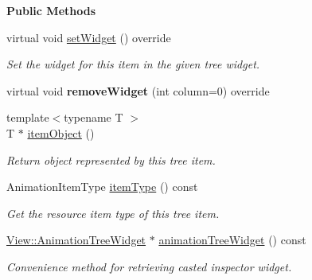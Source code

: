 \begin{Indent}\textbf{ Public Methods}\par
\begin{DoxyCompactItemize}
\item 
virtual void \mbox{\hyperlink{classrev_1_1_view_1_1_animation_item_a20494b0ab95631fb2e2aec918952f0f4}{set\+Widget}} () override
\begin{DoxyCompactList}\small\item\em Set the widget for this item in the given tree widget. \end{DoxyCompactList}\item 
\mbox{\label{classrev_1_1_view_1_1_animation_item_acafd1d856ce7505f4e964dff84ec1024}} 
virtual void {\bfseries remove\+Widget} (int column=0) override
\item 
\mbox{\label{classrev_1_1_view_1_1_animation_item_acf676bee2e51dd909fd2ac2ae34f4c7b}} 
{\footnotesize template$<$typename T $>$ }\\T $\ast$ \mbox{\hyperlink{classrev_1_1_view_1_1_animation_item_acf676bee2e51dd909fd2ac2ae34f4c7b}{item\+Object}} ()
\begin{DoxyCompactList}\small\item\em Return object represented by this tree item. \end{DoxyCompactList}\item 
\mbox{\label{classrev_1_1_view_1_1_animation_item_a7f8cdc9a524128e1520e3d54291ca4a0}} 
Animation\+Item\+Type \mbox{\hyperlink{classrev_1_1_view_1_1_animation_item_a7f8cdc9a524128e1520e3d54291ca4a0}{item\+Type}} () const
\begin{DoxyCompactList}\small\item\em Get the resource item type of this tree item. \end{DoxyCompactList}\item 
\mbox{\label{classrev_1_1_view_1_1_animation_item_aca4538c6c57402168b4c17d431552db0}} 
\mbox{\hyperlink{classrev_1_1_view_1_1_animation_tree_widget}{View\+::\+Animation\+Tree\+Widget}} $\ast$ \mbox{\hyperlink{classrev_1_1_view_1_1_animation_item_aca4538c6c57402168b4c17d431552db0}{animation\+Tree\+Widget}} () const
\begin{DoxyCompactList}\small\item\em Convenience method for retrieving casted inspector widget. \end{DoxyCompactList}\end{DoxyCompactItemize}
\end{Indent}
